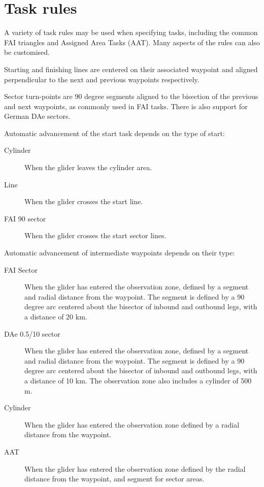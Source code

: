 \documentclass[a4paper,12pt]{refrep}
\begin{document}
\section{Task rules}\label{sec:task-rules}

A variety of task rules may be used when specifying tasks, including
the common FAI triangles and Assigned Area Tasks (AAT).  Many aspects
of the rules can also be customised.

Starting and finishing lines are centered on their associated waypoint
and aligned perpendicular to the next and previous waypoints
respectively.

Sector turn-points are 90 degree segments aligned to the bisection of
the previous and next waypoints, as commonly used in FAI tasks.
There is also support for German DAe sectors.

Automatic advancement of the start task depends on the type of start:
\begin{description}
\item[Cylinder] When the glider leaves the cylinder area.
\item[Line] When the glider crosses the start line.
\item[FAI 90 sector] When the glider crosses the start sector lines.
\end{description}

Automatic advancement of intermediate waypoints depends on their type:
\begin{description}
\item[FAI Sector] When the glider has entered the observation zone, defined 
by a segment and radial distance from the waypoint.  The segment is
defined by a 90 degree arc centered about the bisector of inbound and
outbound legs, with a distance of 20 km.
\item[DAe 0.5/10 sector] When the glider has entered the observation zone, 
defined by a segment and radial distance from the waypoint.  The segment is
defined by a 90 degree arc centered about the bisector of inbound and
outbound legs, with a distance of 10 km.  The observation zone also includes
a cylinder of 500 m.
\item[Cylinder]  When the glider has entered the observation zone defined
by a radial distance from the waypoint.
\item[AAT] When the glider has entered the observation zone defined by the
radial distance from the waypoint, and segment for sector areas.
\end{description}
\end{document}
